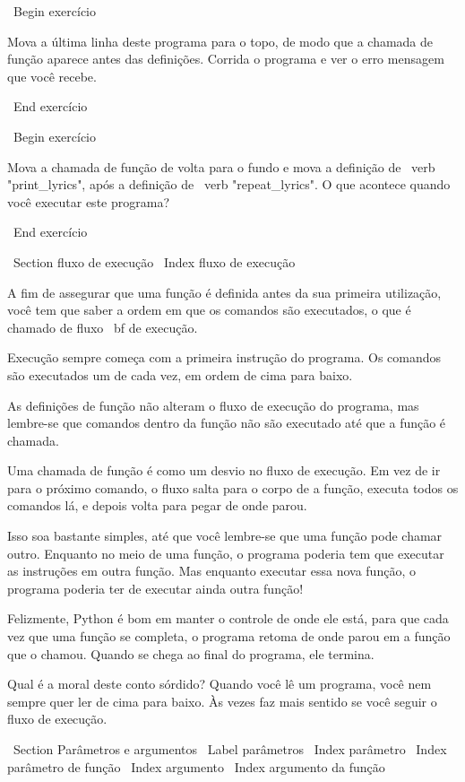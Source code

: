 \documentclass[10pt]{book}
\begin{document}
{\ Begin {} exercício

Mova a última linha deste programa
para o topo, de modo que a chamada de função aparece antes das definições. Corrida
o programa e ver o erro
mensagem que você recebe.

\ End {} exercício

\ Begin {} exercício

Mova a chamada de função de volta para o fundo
e mova a definição de \ verb "print_lyrics", após a definição de
\ verb "repeat_lyrics". O que acontece quando você executar este programa?

\ End {} exercício


\ Section {fluxo de execução}
\ Index {fluxo de execução}

A fim de assegurar que uma função é definida antes da sua primeira utilização,
você tem que saber a ordem em que os comandos são executados, o que é
chamado de fluxo {\ bf de execução}.

Execução sempre começa com a primeira instrução do programa.
Os comandos são executados um de cada vez, em ordem de cima para baixo.

As definições de função não alteram o fluxo de execução do
programa, mas lembre-se que comandos dentro da função não são
executado até que a função é chamada.

Uma chamada de função é como um desvio no fluxo de execução. Em vez de
ir para o próximo comando, o fluxo salta para o corpo de
a função, executa todos os comandos lá, e depois volta
para pegar de onde parou.

Isso soa bastante simples, até que você lembre-se que uma função pode
chamar outro. Enquanto no meio de uma função, o programa poderia
tem que executar as instruções em outra função. Mas enquanto
executar essa nova função, o programa poderia ter de executar ainda
outra função!

Felizmente, Python é bom em manter o controle de onde ele está, para que cada
vez que uma função se completa, o programa retoma de onde parou em
a função que o chamou. Quando se chega ao final do programa,
ele termina.

Qual é a moral deste conto sórdido? Quando você lê um programa, você
nem sempre quer ler de cima para baixo. Às vezes faz
mais sentido se você seguir o fluxo de execução.


\ Section {Parâmetros e argumentos}
\ Label {parâmetros}
\ Index {parâmetro}
\ Index {parâmetro de função}
\ Index {argumento}
\ Index {argumento da função}

}
\end{document}
